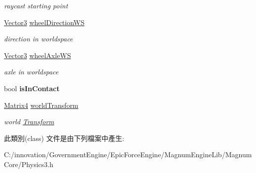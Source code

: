\begin{DoxyCompactItemize}
\begin{DoxyCompactList}\small\item\em raycast starting point \end{DoxyCompactList}\item 
\hyperlink{class_i_dream_sky_1_1_vector3}{Vector3} \hyperlink{class_i_dream_sky_1_1_physics3_1_1_vehicle_1_1_wheel_info_a48bf448ac35163067358c294087d2a0f}{wheel\+Direction\+WS}\hypertarget{class_i_dream_sky_1_1_physics3_1_1_vehicle_1_1_wheel_info_a48bf448ac35163067358c294087d2a0f}{}\label{class_i_dream_sky_1_1_physics3_1_1_vehicle_1_1_wheel_info_a48bf448ac35163067358c294087d2a0f}

\begin{DoxyCompactList}\small\item\em direction in worldspace \end{DoxyCompactList}\item 
\hyperlink{class_i_dream_sky_1_1_vector3}{Vector3} \hyperlink{class_i_dream_sky_1_1_physics3_1_1_vehicle_1_1_wheel_info_a77abd9a7cdbd917eae192d661be18e7b}{wheel\+Axle\+WS}\hypertarget{class_i_dream_sky_1_1_physics3_1_1_vehicle_1_1_wheel_info_a77abd9a7cdbd917eae192d661be18e7b}{}\label{class_i_dream_sky_1_1_physics3_1_1_vehicle_1_1_wheel_info_a77abd9a7cdbd917eae192d661be18e7b}

\begin{DoxyCompactList}\small\item\em axle in worldspace \end{DoxyCompactList}\item 
bool {\bfseries is\+In\+Contact}\hypertarget{class_i_dream_sky_1_1_physics3_1_1_vehicle_1_1_wheel_info_ac762f7f4d7d06e472815ac51c35ee773}{}\label{class_i_dream_sky_1_1_physics3_1_1_vehicle_1_1_wheel_info_ac762f7f4d7d06e472815ac51c35ee773}

\item 
\hyperlink{class_i_dream_sky_1_1_matrix4}{Matrix4} \hyperlink{class_i_dream_sky_1_1_physics3_1_1_vehicle_1_1_wheel_info_a43edbdcd86bfae1f0698fcd08d3ec7e1}{world\+Transform}\hypertarget{class_i_dream_sky_1_1_physics3_1_1_vehicle_1_1_wheel_info_a43edbdcd86bfae1f0698fcd08d3ec7e1}{}\label{class_i_dream_sky_1_1_physics3_1_1_vehicle_1_1_wheel_info_a43edbdcd86bfae1f0698fcd08d3ec7e1}

\begin{DoxyCompactList}\small\item\em world \hyperlink{class_i_dream_sky_1_1_transform}{Transform} \end{DoxyCompactList}\end{DoxyCompactItemize}


此類別(class) 文件是由下列檔案中產生\+:\begin{DoxyCompactItemize}
\item 
C\+:/innovation/\+Government\+Engine/\+Epic\+Force\+Engine/\+Magnum\+Engine\+Lib/\+Magnum\+Core/Physics3.\+h\end{DoxyCompactItemize}
